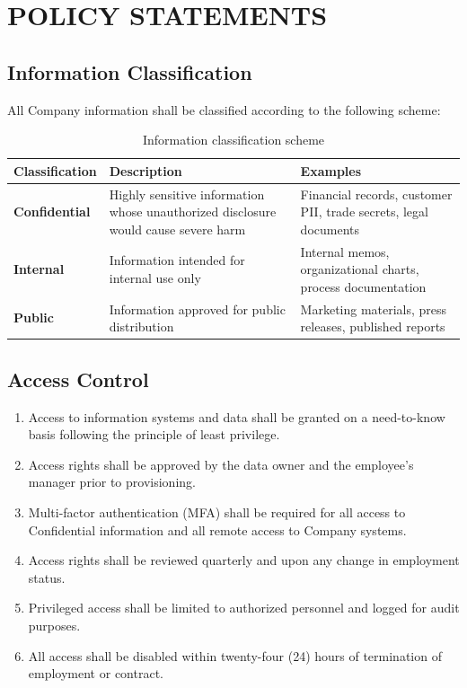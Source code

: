 \documentclass[
    language=english,
    doctype=policy-document,
    institution=none,
]{../../omnilatex}
\begin{document}
\section{POLICY STATEMENTS}

\subsection{Information Classification}

All Company information shall be classified according to the following scheme:

\begin{table}[h]
\centering
\begin{tabular}{p{3cm}p{6cm}p{5cm}}
\toprule
\textbf{Classification} & \textbf{Description} & \textbf{Examples} \\
\midrule
\textbf{Confidential} & Highly sensitive information whose unauthorized disclosure would cause severe harm & Financial records, customer PII, trade secrets, legal documents \\
\textbf{Internal} & Information intended for internal use only & Internal memos, organizational charts, process documentation \\
\textbf{Public} & Information approved for public distribution & Marketing materials, press releases, published reports \\
\bottomrule
\end{tabular}
\caption{Information classification scheme}
\end{table}

\subsection{Access Control}

\begin{enumerate}[label=\textbf{\arabic*.}]
    \item Access to information systems and data shall be granted on a need-to-know basis following the principle of least privilege.
    \item Access rights shall be approved by the data owner and the employee's manager prior to provisioning.
    \item Multi-factor authentication (MFA) shall be required for all access to Confidential information and all remote access to Company systems.
    \item Access rights shall be reviewed quarterly and upon any change in employment status.
    \item Privileged access shall be limited to authorized personnel and logged for audit purposes.
    \item All access shall be disabled within twenty-four (24) hours of termination of employment or contract.
\end{enumerate}
\end{document}
